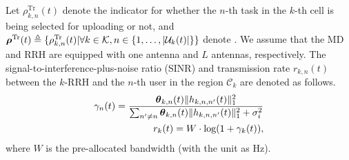 Let $\rho^{\mathrm{Tr}}_{k, n}(t)$ denote the indicator for whether the $n$-th task in the $k$-th cell is being selected for uploading or not, and $\boldsymbol{\rho}^{\mathrm{Tr}}(t) \triangleq \{\rho^{\mathrm{Tr}}_{k, n}(t) | \forall k\in\mathcal{K},n\in\{1,\dots,|\mathcal{U}_{k}(t)|\}\}$ denote .
We assume that the MD and RRH are equipped with one antenna and $L$ antennas, respectively.
The signal-to-interference-plus-noise ratio (SINR) and transmission rate $r_{k,n}(t)$ between the $k$-RRH and the $n$-th user in the region $\mathcal{C}_{k}$ are denoted as follows.
\begin{align}
    \gamma_{n}(t) = \frac{
        \boldsymbol{\theta}_{k,n}(t) \lVert h_{k,n,n'}(t)\|_1^2
    }{
        \sum_{n' \neq n} \boldsymbol{\theta}_{k,n}(t) \lVert h_{k,n,n'}(t)\|_1^2 + \sigma_{i}^{2}
    }
    \\
    r_{k}(t)= W\cdot \text{log}(1+\gamma_{k}(t)),
\end{align}%
where $W$ is the pre-allocated bandwidth (with the unit as Hz).
%


